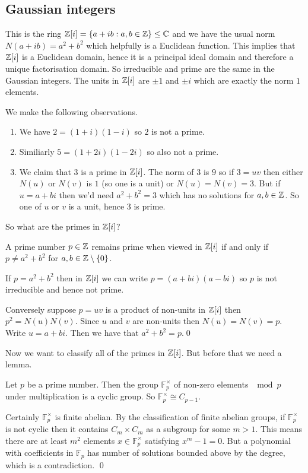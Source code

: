 \documentclass{article}
\begin{document}
\subsection{Gaussian integers}
This is the ring $ \mathbb{Z}[i]=\{a+ib:a,b\in \mathbb{Z}\}\le \mathbb{C} $ and we have the usual norm $ N(a+ib)=a^2+b^2 $ which helpfully is a Euclidean function. This implies that $ \mathbb{Z}[i] $ is a Euclidean domain, hence it is a principal ideal domain and therefore a unique factorisation domain. So irreducible and prime are the same in the Gaussian integers. The units in $ \mathbb{Z}[i] $ are $ \pm 1 $ and $ \pm i $ which are exactly the norm $ 1 $ elements.\par
We make the following observations.
\begin{enumerate}
	\item We have $ 2 = (1+i)(1-i)$ so $ 2 $ is not a prime.
	\item Similiarly $ 5=(1+2i)(1-2i) $ so also not a prime.
	\item We claim that $ 3 $ is a prime in $ \mathbb{Z}[i] $. The norm of $ 3 $ is $9 $ so if $ 3=uv $ then either $ N(u) $ or $ N(v) $ is $ 1 $ (so one is a unit) or $ N(u)=N(v)=3 $. But if $ u=a+bi $ then we'd need $ a^2+b^2=3 $ which has no solutions for $ a,b\in \mathbb{Z} $. So one of $ u $ or $ v $ is a unit, hence $ 3 $ is prime. 
\end{enumerate} 
So what are the primes in $ \mathbb{Z}[i] $?
\begin{proposition}
	A prime number $ p\in \mathbb{Z} $ remains prime when viewed in $ \mathbb{Z}[i] $ if and only if $ p\ne a^2+b^2 $ for $ a,b\in \mathbb{Z}\setminus \{0\} $.
\end{proposition}
\pf If $ p=a^2+b^2 $ then in $ \mathbb{Z}[i] $ we can write $ p=(a+bi)(a-bi) $ so $ p $ is not irreducible and hence not prime.\par
Conversely suppose $ p = uv $ is a product of non-units in $ \mathbb{Z}[i] $ then $ p^2=N(u)N(v) $. Since $ u $ and $ v $ are non-units then $ N(u)=N(v)=p $. Write $ u=a+bi $. Then we have that $ a^2+b^2=p $.\qed
\par
Now we want to classify all of the primes in $ \mathbb{Z}[i] $. But before that we need a lemma.
\begin{lemma}
	Let $ p $ be a prime number. Then the group $ \mathbb F_p^\times $ of non-zero elements $ \mod p $ under multiplication is a cyclic group. So $ \mathbb F_p^\times \cong C_{p-1}. $
\end{lemma}
\pf
Certainly $ \mathbb F_p^\times $ is finite abelian. By the classification of finite abelian groups, if $ \mathbb F_p^\times $ is not cyclic then it contains $ C_m\times C_m  $ as a subgroup for some $ m>1 $. This means there are at least $ m^2 $ elements $ x\in \mathbb F_p^\times $ satisfying $ x^m-1=0 $. But a polynomial with coefficients in $ \mathbb F_p $ has number of solutions bounded above by the degree, which is a contradiction. \qed\par
\end{document}
